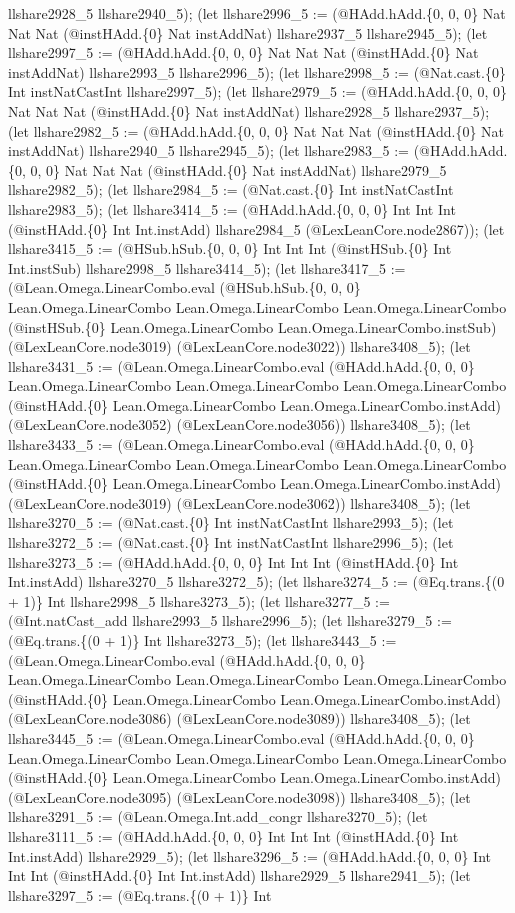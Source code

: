 \documentclass[11pt]{article}
\begin{document}
llshare2928\_5 llshare2940\_5); (let llshare2996\_5 := (@HAdd.hAdd.\{0, 0, 0\} Nat Nat Nat (@instHAdd.\{0\} Nat instAddNat) llshare2937\_5 llshare2945\_5); (let llshare2997\_5 := (@HAdd.hAdd.\{0, 0, 0\} Nat Nat Nat (@instHAdd.\{0\} Nat instAddNat) llshare2993\_5 llshare2996\_5); (let llshare2998\_5 := (@Nat.cast.\{0\} Int instNatCastInt llshare2997\_5); (let llshare2979\_5 := (@HAdd.hAdd.\{0, 0, 0\} Nat Nat Nat (@instHAdd.\{0\} Nat instAddNat) llshare2928\_5 llshare2937\_5); (let llshare2982\_5 := (@HAdd.hAdd.\{0, 0, 0\} Nat Nat Nat (@instHAdd.\{0\} Nat instAddNat) llshare2940\_5 llshare2945\_5); (let llshare2983\_5 := (@HAdd.hAdd.\{0, 0, 0\} Nat Nat Nat (@instHAdd.\{0\} Nat instAddNat) llshare2979\_5 llshare2982\_5); (let llshare2984\_5 := (@Nat.cast.\{0\} Int instNatCastInt llshare2983\_5); (let llshare3414\_5 := (@HAdd.hAdd.\{0, 0, 0\} Int Int Int (@instHAdd.\{0\} Int Int.instAdd) llshare2984\_5 (@LexLeanCore.node2867)); (let llshare3415\_5 := (@HSub.hSub.\{0, 0, 0\} Int Int Int (@instHSub.\{0\} Int Int.instSub) llshare2998\_5 llshare3414\_5); (let llshare3417\_5 := (@Lean.Omega.LinearCombo.eval (@HSub.hSub.\{0, 0, 0\} Lean.Omega.LinearCombo Lean.Omega.LinearCombo Lean.Omega.LinearCombo (@instHSub.\{0\} Lean.Omega.LinearCombo Lean.Omega.LinearCombo.instSub) (@LexLeanCore.node3019) (@LexLeanCore.node3022)) llshare3408\_5); (let llshare3431\_5 := (@Lean.Omega.LinearCombo.eval (@HAdd.hAdd.\{0, 0, 0\} Lean.Omega.LinearCombo Lean.Omega.LinearCombo Lean.Omega.LinearCombo (@instHAdd.\{0\} Lean.Omega.LinearCombo Lean.Omega.LinearCombo.instAdd) (@LexLeanCore.node3052) (@LexLeanCore.node3056)) llshare3408\_5); (let llshare3433\_5 := (@Lean.Omega.LinearCombo.eval (@HAdd.hAdd.\{0, 0, 0\} Lean.Omega.LinearCombo Lean.Omega.LinearCombo Lean.Omega.LinearCombo (@instHAdd.\{0\} Lean.Omega.LinearCombo Lean.Omega.LinearCombo.instAdd) (@LexLeanCore.node3019) (@LexLeanCore.node3062)) llshare3408\_5); (let llshare3270\_5 := (@Nat.cast.\{0\} Int instNatCastInt llshare2993\_5); (let llshare3272\_5 := (@Nat.cast.\{0\} Int instNatCastInt llshare2996\_5); (let llshare3273\_5 := (@HAdd.hAdd.\{0, 0, 0\} Int Int Int (@instHAdd.\{0\} Int Int.instAdd) llshare3270\_5 llshare3272\_5); (let llshare3274\_5 := (@Eq.trans.\{(0 + 1)\} Int llshare2998\_5 llshare3273\_5); (let llshare3277\_5 := (@Int.natCast\_add llshare2993\_5 llshare2996\_5); (let llshare3279\_5 := (@Eq.trans.\{(0 + 1)\} Int llshare3273\_5); (let llshare3443\_5 := (@Lean.Omega.LinearCombo.eval (@HAdd.hAdd.\{0, 0, 0\} Lean.Omega.LinearCombo Lean.Omega.LinearCombo Lean.Omega.LinearCombo (@instHAdd.\{0\} Lean.Omega.LinearCombo Lean.Omega.LinearCombo.instAdd) (@LexLeanCore.node3086) (@LexLeanCore.node3089)) llshare3408\_5); (let llshare3445\_5 := (@Lean.Omega.LinearCombo.eval (@HAdd.hAdd.\{0, 0, 0\} Lean.Omega.LinearCombo Lean.Omega.LinearCombo Lean.Omega.LinearCombo (@instHAdd.\{0\} Lean.Omega.LinearCombo Lean.Omega.LinearCombo.instAdd) (@LexLeanCore.node3095) (@LexLeanCore.node3098)) llshare3408\_5); (let llshare3291\_5 := (@Lean.Omega.Int.add\_congr llshare3270\_5); (let llshare3111\_5 := (@HAdd.hAdd.\{0, 0, 0\} Int Int Int (@instHAdd.\{0\} Int Int.instAdd) llshare2929\_5); (let llshare3296\_5 := (@HAdd.hAdd.\{0, 0, 0\} Int Int Int (@instHAdd.\{0\} Int Int.instAdd) llshare2929\_5 llshare2941\_5); (let llshare3297\_5 := (@Eq.trans.\{(0 + 1)\} Int 
\end{document}
